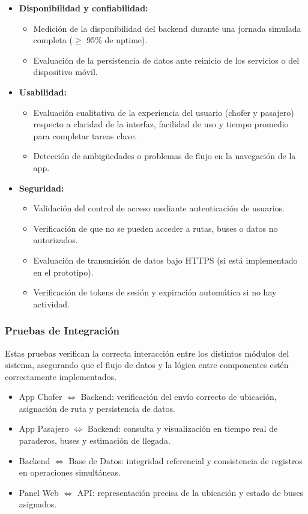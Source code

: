 \documentclass[12pt]{article}
\begin{document}
\begin{itemize}
    \item \textbf{Disponibilidad y confiabilidad:}
    \begin{itemize}
        \item Medición de la disponibilidad del backend durante una jornada simulada completa ($\geq$ 95\% de uptime).
        \item Evaluación de la persistencia de datos ante reinicio de los servicios o del dispositivo móvil.
    \end{itemize}
\newpage
    \item \textbf{Usabilidad:}
    \begin{itemize}
        \item Evaluación cualitativa de la experiencia del usuario (chofer y pasajero) respecto a claridad de la interfaz, facilidad de uso y tiempo promedio para completar tareas clave.
        \item Detección de ambigüedades o problemas de flujo en la navegación de la app.
    \end{itemize}

    \item \textbf{Seguridad:}
    \begin{itemize}
        \item Validación del control de acceso mediante autenticación de usuarios.
        \item Verificación de que no se pueden acceder a rutas, buses o datos no autorizados.
        \item Evaluación de transmisión de datos bajo HTTPS (si está implementado en el prototipo).
        \item Verificación de tokens de sesión y expiración automática si no hay actividad.
    \end{itemize}
\end{itemize}

\newpage
\subsubsection*{Pruebas de Integración}

Estas pruebas verifican la correcta interacción entre los distintos módulos del sistema, asegurando que el flujo de datos y la lógica entre componentes estén correctamente implementados.

\begin{itemize}
    \item App Chofer $\Leftrightarrow$ Backend: verificación del envío correcto de ubicación, asignación de ruta y persistencia de datos.
    \item App Pasajero $\Leftrightarrow$ Backend: consulta y visualización en tiempo real de paraderos, buses y estimación de llegada.
    \item Backend $\Leftrightarrow$ Base de Datos: integridad referencial y consistencia de registros en operaciones simultáneas.
    \item Panel Web $\Leftrightarrow$ API: representación precisa de la ubicación y estado de buses asignados.
\end{itemize}
\end{document}

